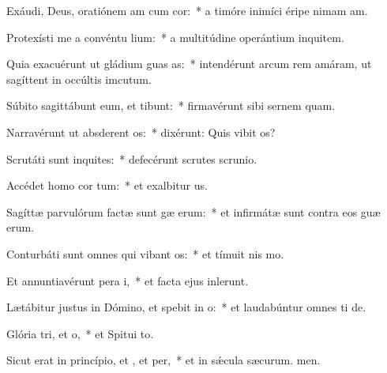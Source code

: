 \item Exáudi, Deus, oratiónem am cum cor:~* a timóre inimíci éripe nimam am.
\item Protexísti me a convéntu lium:~* a multitúdine operántium inquitem.
\item Quia exacuérunt ut gládium guas as:~* intendérunt arcum rem amáram, ut sagíttent in occúltis imcutum.
\item Súbito sagittábunt eum, et  tibunt:~* firmavérunt sibi sernem quam.
\item Narravérunt ut absderent os:~* dixérunt: Quis vibit os?
\item Scrutáti sunt inquites:~* defecérunt scrutes scrunio.
\item Accédet homo  cor tum:~* et exalbitur us.
\item Sagíttæ parvulórum factæ sunt gæ erum:~* et infirmátæ sunt contra eos guæ erum.
\item Conturbáti sunt omnes qui vibant os:~* et tímuit nis mo.
\item Et annuntiavérunt pera i,~* et facta ejus inlerunt.
\item Lætábitur justus in Dómino, et spebit in o:~* et laudabúntur omnes ti de.
\item Glória tri, et o,~* et Spitui to.
\item Sicut erat in princípio, et , et per,~* et in sǽcula sæcurum. men.
